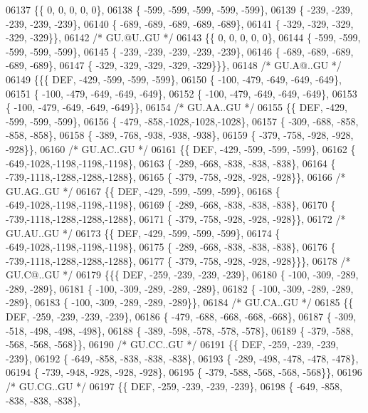 \begin{DoxyCode}
06137 \{\{    0,    0,    0,    0,    0\},
06138 \{ -599, -599, -599, -599, -599\},
06139 \{ -239, -239, -239, -239, -239\},
06140 \{ -689, -689, -689, -689, -689\},
06141 \{ -329, -329, -329, -329, -329\}\},
06142 \textcolor{comment}{/* GU.@U..GU */}
06143 \{\{    0,    0,    0,    0,    0\},
06144 \{ -599, -599, -599, -599, -599\},
06145 \{ -239, -239, -239, -239, -239\},
06146 \{ -689, -689, -689, -689, -689\},
06147 \{ -329, -329, -329, -329, -329\}\}\},
06148 \textcolor{comment}{/* GU.A@..GU */}
06149 \{\{\{  DEF, -429, -599, -599, -599\},
06150 \{ -100, -479, -649, -649, -649\},
06151 \{ -100, -479, -649, -649, -649\},
06152 \{ -100, -479, -649, -649, -649\},
06153 \{ -100, -479, -649, -649, -649\}\},
06154 \textcolor{comment}{/* GU.AA..GU */}
06155 \{\{  DEF, -429, -599, -599, -599\},
06156 \{ -479, -858,-1028,-1028,-1028\},
06157 \{ -309, -688, -858, -858, -858\},
06158 \{ -389, -768, -938, -938, -938\},
06159 \{ -379, -758, -928, -928, -928\}\},
06160 \textcolor{comment}{/* GU.AC..GU */}
06161 \{\{  DEF, -429, -599, -599, -599\},
06162 \{ -649,-1028,-1198,-1198,-1198\},
06163 \{ -289, -668, -838, -838, -838\},
06164 \{ -739,-1118,-1288,-1288,-1288\},
06165 \{ -379, -758, -928, -928, -928\}\},
06166 \textcolor{comment}{/* GU.AG..GU */}
06167 \{\{  DEF, -429, -599, -599, -599\},
06168 \{ -649,-1028,-1198,-1198,-1198\},
06169 \{ -289, -668, -838, -838, -838\},
06170 \{ -739,-1118,-1288,-1288,-1288\},
06171 \{ -379, -758, -928, -928, -928\}\},
06172 \textcolor{comment}{/* GU.AU..GU */}
06173 \{\{  DEF, -429, -599, -599, -599\},
06174 \{ -649,-1028,-1198,-1198,-1198\},
06175 \{ -289, -668, -838, -838, -838\},
06176 \{ -739,-1118,-1288,-1288,-1288\},
06177 \{ -379, -758, -928, -928, -928\}\}\},
06178 \textcolor{comment}{/* GU.C@..GU */}
06179 \{\{\{  DEF, -259, -239, -239, -239\},
06180 \{ -100, -309, -289, -289, -289\},
06181 \{ -100, -309, -289, -289, -289\},
06182 \{ -100, -309, -289, -289, -289\},
06183 \{ -100, -309, -289, -289, -289\}\},
06184 \textcolor{comment}{/* GU.CA..GU */}
06185 \{\{  DEF, -259, -239, -239, -239\},
06186 \{ -479, -688, -668, -668, -668\},
06187 \{ -309, -518, -498, -498, -498\},
06188 \{ -389, -598, -578, -578, -578\},
06189 \{ -379, -588, -568, -568, -568\}\},
06190 \textcolor{comment}{/* GU.CC..GU */}
06191 \{\{  DEF, -259, -239, -239, -239\},
06192 \{ -649, -858, -838, -838, -838\},
06193 \{ -289, -498, -478, -478, -478\},
06194 \{ -739, -948, -928, -928, -928\},
06195 \{ -379, -588, -568, -568, -568\}\},
06196 \textcolor{comment}{/* GU.CG..GU */}
06197 \{\{  DEF, -259, -239, -239, -239\},
06198 \{ -649, -858, -838, -838, -838\},

\end{DoxyCode}
